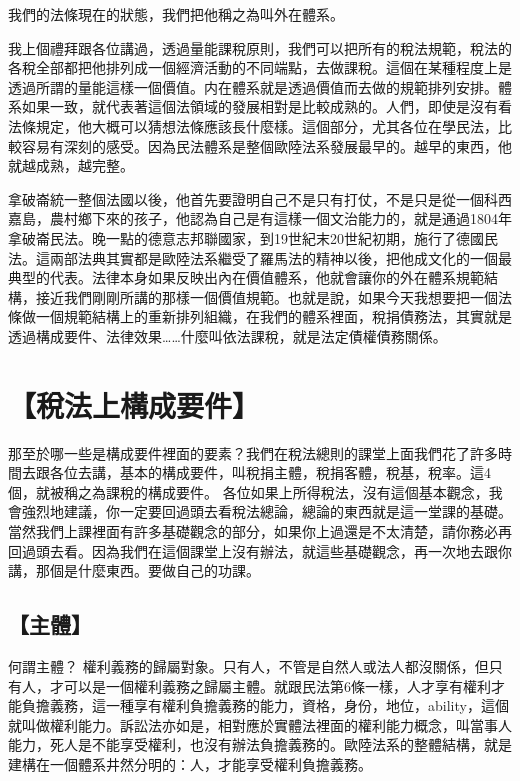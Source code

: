 \documentclass[oneside,sub3section]{ctexbook}
\begin{document}
我們的法條現在的狀態，我們把他稱之為叫外在體系。

我上個禮拜跟各位講過，透過量能課稅原則，我們可以把所有的稅法規範，稅法的各稅全部都把他排列成一個經濟活動的不同端點，去做課稅。這個在某種程度上是透過所謂的量能這樣一個價值。内在體系就是透過價值而去做的規範排列安排。體系如果一致，就代表著這個法領域的發展相對是比較成熟的。人們，即使是沒有看法條規定，他大概可以猜想法條應該長什麼樣。這個部分，尤其各位在學民法，比較容易有深刻的感受。因為民法體系是整個歐陸法系發展最早的。越早的東西，他就越成熟，越完整。

拿破崙統一整個法國以後，他首先要證明自己不是只有打仗，不是只是從一個科西嘉島，農村鄉下來的孩子，他認為自己是有這樣一個文治能力的，就是通過1804年拿破崙民法。晚一點的德意志邦聯國家，到19世紀末20世紀初期，施行了德國民法。這兩部法典其實都是歐陸法系繼受了羅馬法的精神以後，把他成文化的一個最典型的代表。法律本身如果反映出內在價值體系，他就會讓你的外在體系規範結構，接近我們剛剛所講的那樣一個價值規範。也就是說，如果今天我想要把一個法條做一個規範結構上的重新排列組織，在我們的體系裡面，稅捐債務法，其實就是透過構成要件、法律效果\ldots\ldots 什麼叫依法課稅，就是法定債權債務關係。

\hypertarget{ux7a05ux6cd5ux4e0aux69cbux6210ux8981ux4ef6}{%
\section{【稅法上構成要件】}\label{ux7a05ux6cd5ux4e0aux69cbux6210ux8981ux4ef6}}

那至於哪一些是構成要件裡面的要素？我們在稅法總則的課堂上面我們花了許多時間去跟各位去講，基本的構成要件，叫稅捐主體，稅捐客體，稅基，稅率。這4個，就被稱之為課稅的構成要件。
各位如果上所得稅法，沒有這個基本觀念，我會強烈地建議，你一定要回過頭去看稅法總論，總論的東西就是這一堂課的基礎。當然我們上課裡面有許多基礎觀念的部分，如果你上過還是不太清楚，請你務必再回過頭去看。因為我們在這個課堂上沒有辦法，就這些基礎觀念，再一次地去跟你講，那個是什麼東西。要做自己的功課。

\hypertarget{ux4e3bux9ad4}{%
\subsection{【主體】}\label{ux4e3bux9ad4}}

何謂主體？ 權利義務的歸屬對象。只有人，不管是自然人或法人都沒關係，但只有人，才可以是一個權利義務之歸屬主體。就跟民法第6條一樣，人才享有權利才能負擔義務，這一種享有權利負擔義務的能力，資格，身份，地位，ability，這個就叫做權利能力。訴訟法亦如是，相對應於實體法裡面的權利能力概念，叫當事人能力，死人是不能享受權利，也沒有辦法負擔義務的。歐陸法系的整體結構，就是建構在一個體系井然分明的：人，才能享受權利負擔義務。
\end{document}
